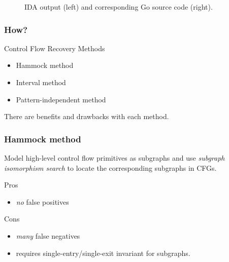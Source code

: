 \documentclass[aspectratio=1610]{beamer}
\begin{document}
\begin{frame}
\begin{figure}[htbp]
\begin{subfigure}[ht]{0.30\textwidth}
		\end{subfigure}
		\begin{subfigure}[ht]{0.40\textwidth}
			\centering
			
		\end{subfigure}
		\caption{IDA output (left) and corresponding Go source code (right).}
	\end{figure}
\end{frame}




\begin{frame}
	\frametitle{How?}

	\begin{block}{Control Flow Recovery Methods}
		\begin{itemize}
			\item Hammock method
			\item Interval method
			\item Pattern-independent method
		\end{itemize}
	\end{block}

	There are benefits and drawbacks with each method.
\end{frame}


\begin{frame}
	\frametitle{Hammock method}

	Model high-level control flow primitives as subgraphs and use \textit{subgraph isomorphism search} to locate the corresponding subgraphs in CFGs.

	\vspace*{2em}

	\begin{block}{Pros}
		\begin{itemize}
			\item \textit{no} false positives
		\end{itemize}
	\end{block}

	\begin{block}{Cons}
		\begin{itemize}
			\item \textit{many} false negatives
			\item requires single-entry/single-exit invariant for subgraphs.
		\end{itemize}
	\end{block}

\end{frame}
\end{document}
